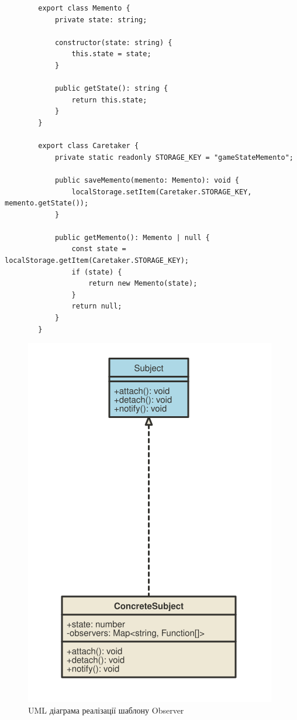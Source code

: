 \documentclass[oneside,14pt]{extarticle}
\begin{document}
\begin{normalsize}
	\begin{small}
		\begin{lstlisting}
		export class Memento {
			private state: string;
			
			constructor(state: string) {
				this.state = state;
			}
			
			public getState(): string {
				return this.state;
			}
		}
		
		export class Caretaker {
			private static readonly STORAGE_KEY = "gameStateMemento";
			
			public saveMemento(memento: Memento): void {
				localStorage.setItem(Caretaker.STORAGE_KEY, memento.getState());
			}
			
			public getMemento(): Memento | null {
				const state = localStorage.getItem(Caretaker.STORAGE_KEY);
				if (state) {
					return new Memento(state);
				}
				return null;
			}
		}
		\end{lstlisting}
	\end{small}
	
	\begin{figure}[H]
		\centering
		\includegraphics{observer}
		\caption{UML діаграма реалізації шаблону Observer}
	\end{figure}
	

\end{normalsize}
\end{document}
